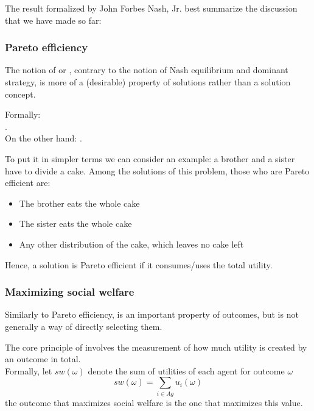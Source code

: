 		The result formalized by John Forbes Nash, Jr. best summarize the discussion that we have made so far:\\
		
\subsubsection{Pareto efficiency}
The notion of  or , contrary to the notion of Nash equilibrium and dominant strategy, is more of a (desirable) property of solutions rather than a solution concept.
		
		Formally:\\
		.\cite{mastxt}\\
		On the other hand:
		\cite{mastxt}.
		
		To put it in simpler terms we can consider an example: a brother and a sister have to divide a cake. Among the solutions of this problem, those who are Pareto efficient are:
		\begin{itemize}
		\item The brother eats the whole cake
		\item The sister eats the whole cake
		\item Any other distribution of the cake, which leaves no cake left
		\end{itemize}
		Hence, a solution is Pareto efficient if it consumes/uses the total utility.
		
\subsubsection{Maximizing social welfare}
Similarly to Pareto efficiency,  is an important property of outcomes, but is not generally a way of directly selecting them.
		
		The core principle of  involves the measurement of how much utility is created by an outcome in total.\\
		Formally, let $sw(\omega)$ denote the sum of utilities of each agent for outcome $\omega$
		\[sw(\omega) =\sum_{i\in Ag} u_i(\omega)\]
		the outcome that maximizes social welfare is the one that maximizes this value.
		
